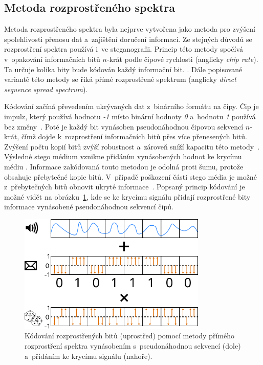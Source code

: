 \subsection*{Metoda rozprostřeného spektra}
\label{sub:dsss}

Metoda rozprostřeného spektra byla nejprve vytvořena jako metoda pro zvýšení
spolehlivosti přenosu dat a~zajištění doručení informací. Ze stejných důvodů se
rozprostření spektra používá i~ve steganografii. Princip této metody spočívá
v~opakování informačních bitů $n$-krát podle čipové rychlosti (anglicky
\textit{chip rate}). Ta určuje kolika bity bude kódován každý informační bit.
\cite{AlSabhany2020}. Dále popisované variantě této metody se říká přímé
rozprostřené spektrum (anglicky \textit{direct sequence spread spectrum}).

Kódování začíná převedením ukrývaných dat z~binárního formátu na čipy. Čip je
impulz, který používá hodnotu \textit{-1} místo binární hodnoty \textit{0}
a~hodnotu \textit{1} používá bez změny~\cite{Kuznetsov2022}. Poté je každý bit
vynásoben pseudonáhodnou čipovou sekvencí $n$-krát, čímž dojde k~rozprostření
informačních bitů přes více přenesených bitů. Zvýšení počtu kopií bitů zvýší
robustnost a~zároveň sníží kapacitu této metody~\cite{AlSabhany2020}. Výsledné
stego médium vznikne přidáním vynásobených hodnot ke krycímu médiu
\cite{Kuznetsov2022}. Informace zakódovaná touto metodou je odolná proti šumu,
protože obsahuje přebytečné kopie bitů. V~případě poškození části stego média
je možné z~přebytečných bitů obnovit ukryté informace~\cite{Djebbar2012}.
Popsaný princip kódování je možné vidět na obrázku~\ref{pic:dsss-spreading},
kde se ke krycímu signálu přidají rozprostřené bity informace vynásobené
pseudonáhodnou sekvencí čipů.

\begin{figure}[hbt]
    \centering
    \includegraphics[width=0.8\textwidth]{obrazky/direct-sequence-spread-spectrum-diagram.pdf}
    \caption{Kódování rozprostřených bitů (uprostřed) pomocí metody přímého
    rozprostření spektra vynásobením s~pseudonáhodnou sekvencí (dole)
    a~přidáním ke krycímu signálu (nahoře).}
    \label{pic:dsss-spreading}
\end{figure}

